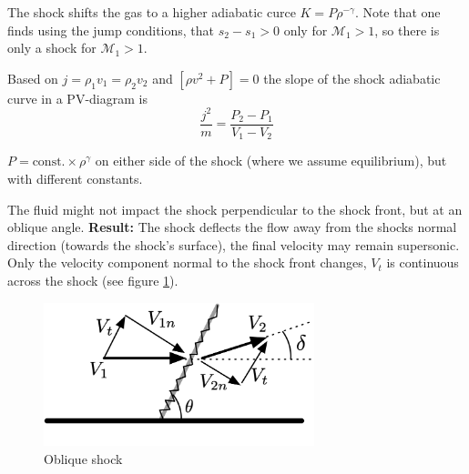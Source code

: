 The shock shifts the gas to a higher adiabatic curce $K=P\rho^{-\gamma}$. Note that one finds using the jump conditions, that $s_2 - s_1 > 0$ only
for $\mathcal{M}_1 > 1$, so there is only a shock for $\mathcal{M}_1 > 1$.

Based on $j=\rho_1 v_1 = \rho_2 v_2$ and $[\rho v^2 + P] = 0$ the slope of the shock adiabatic curve in a PV-diagram is
\begin{equation}
    \frac{j^2}{m} = \frac{P_2 - P_1}{V_1 - V_2}
\end{equation}

$P = \text{const.} \times \rho^\gamma$ on either side of the shock (where we assume equilibrium), but with different constants.


The fluid might not impact the shock perpendicular to the shock front, but at an oblique angle.
\textbf{Result:} The shock deflects the flow away from the shocks normal direction (towards the shock's surface), the final velocity may remain supersonic. 
Only the velocity component normal to the shock front changes, $V_t$ is continuous across the shock (see figure \ref{fig:oblique_shock}).

\begin{figure}[!htb]
    \centering
    \includegraphics[width=0.7\textwidth]{figures/oblique-shock.png}
    \caption{Oblique shock}
    \label{fig:oblique_shock}
\end{figure}

